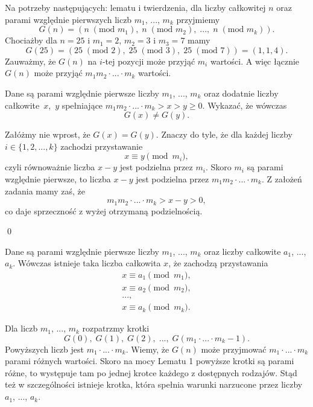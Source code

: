 

\noindent
Na potrzeby następujących: lematu i twierdzenia, dla liczby całkowitej $n$ oraz parami względnie pierwszych liczb $m_1$, ..., $m_k$ przyjmiemy
\[
	G(n) = (n \;(\text{mod } m_1),\; n \;(\text{mod } m_2),\; ...,\; n \;(\text{mod } m_k)).
\]
Chociażby dla $n = 25$ i $m_1 = 2$, $m_2 = 3$ i $m_3 = 7$ mamy
\[
	G(25) = (25 \;(\text{mod } 2),\; 25 \;(\text{mod } 3),\; 25 \;(\text{mod } 7)) = (1, 1, 4).
\]
Zauważmy, że $G(n)$ na $i$-tej pozycji może przyjąć $m_i$ wartości. A więc łącznie $G(n)$ może przyjąć $m_1m_2\cdot...\cdot m_k$ wartości.

\vspace{10px}


\noindent
Dane są parami względnie pierwsze liczby $m_1$, ..., $m_k$ oraz dodatnie liczby całkowite~$x$,~$y$ spełniające $m_1m_2\cdot ... \cdot m_k > x > y \geqslant 0$. Wykazać, że wówczas
\[
	G(x) \neq G(y).
\]


\noindent
Załóżmy nie wprost, że $G(x) = G(y)$. Znaczy do tyle, że dla każdej liczby $i \in \{1, 2, ..., k\}$ zachodzi przystawanie
\[
	x \equiv y \pmod{m_i},
\]
czyli równoważnie liczba $x - y$ jest podzielna przez $m_i$. Skoro $m_i$ są parami względnie pierwsze, to liczba $x - y$ jest podzielna przez $m_1m_2 \cdot ... \cdot m_k$. Z założeń zadania mamy zaś, że
\[
	m_1m_2 \cdot ... \cdot m_k > x - y > 0,
\]
co daje sprzeczność z wyżej otrzymaną podzielnością.

\qed

\vspace{10px}


\noindent
Dane są parami względnie pierwsze liczby $m_1$, ..., $m_k$ oraz  liczby całkowite $a_1$, ..., $a_k$. Wówczas istnieje taka liczba całkowita $x$, że zachodzą przystawania
\begin{gather*}
	x \equiv a_1 \pmod{m_1}, \\
	x \equiv a_2 \pmod{m_2}, \\
	..., \\
	x \equiv a_k \pmod{m_k}.
\end{gather*}


\noindent
Dla liczb $m_1$, ..., $m_k$ rozpatrzmy krotki
\[
	G(0),\; G(1),\; G(2),\; ...,\; G(m_1 \cdot ...\cdot m_k - 1).
\]
Powyższych liczb jest $m_1 \cdot ...\cdot m_k$. Wiemy, że $G(n)$ może przyjmować $m_1 \cdot ...\cdot m_k$ parami różnych wartości. Skoro na mocy Lematu 1 powyższe krotki są parami różne, to występuje tam po jednej krotce każdego z dostępnych rodzajów. Stąd też w szczególności istnieje krotka, która spełnia warunki narzucone przez liczby $a_1$, ..., $a_k$.

